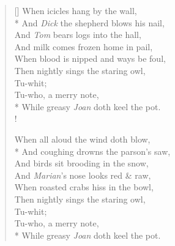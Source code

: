 \documentclass[MAIN]{subfiles}
\begin{document}
\begin{verse}[\versewidth]
When icicles hang by the wall,\\*
\vin And \emph{Dick} the shepherd blows his nail,\\
And \emph{Tom} bears logs into the hall,\\
\vin And milk comes frozen home in pail,\\
When blood is nipped and ways be foul,\\
Then nightly sings the staring owl,\\
\vin \vin Tu-whit;\\
\vin \vin Tu-who, a merry note,\\*
While greasy \emph{Joan} doth keel the pot.\\!

When all aloud the wind doth blow,\\*
\vin And coughing drowns the parson's saw,\\
And birds sit brooding in the snow,\\
\vin And \emph{Marian}'s nose looks red \& raw,\\
When roasted crabs hiss in the bowl,\\
Then nightly sings the staring owl,\\
\vin \vin Tu-whit;\\
\vin \vin Tu-who, a merry note,\\*
While greasy \emph{Joan} doth keel the pot.
\end{verse}
\end{document}
